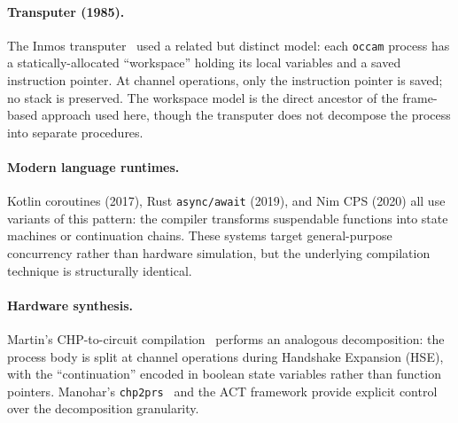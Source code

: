 \documentclass[11pt,letterpaper]{article}
\begin{document}
\paragraph{Transputer (1985).}
The Inmos transputer~\cite{may1987} used a related but distinct
model: each \texttt{occam} process has a statically-allocated
``workspace'' holding its local variables and a saved instruction
pointer.  At channel operations, only the instruction pointer is
saved; no stack is preserved.  The workspace model is the direct
ancestor of the frame-based approach used here, though the
transputer does not decompose the process into separate
procedures.

\paragraph{Modern language runtimes.}
Kotlin coroutines (2017), Rust \texttt{async/await} (2019), and
Nim CPS (2020) all use variants of this pattern: the compiler
transforms suspendable functions into state machines or
continuation chains.  These systems target general-purpose
concurrency rather than hardware simulation, but the underlying
compilation technique is structurally identical.

\paragraph{Hardware synthesis.}
Martin's CHP-to-circuit compilation~\cite{martin1990} performs an
analogous decomposition: the process body is split at channel
operations during Handshake Expansion (HSE), with the
``continuation'' encoded in boolean state variables rather than
function pointers.  Manohar's \texttt{chp2prs}~\cite{manohar2019}
and the ACT framework provide explicit control over the
decomposition granularity.
\end{document}

